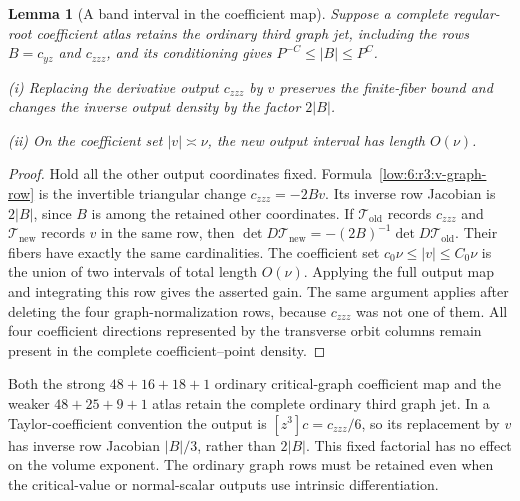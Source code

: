 \documentclass[11pt]{amsart}
\newtheorem{lemma}[theorem]{Lemma}
\theoremstyle{definition}
\theoremstyle{remark}
\numberwithin{equation}{section}
\begin{document}
\begin{lemma}[A band interval in the coefficient map]\label{low:6:r3:v-output}
Suppose a complete regular-root coefficient atlas retains the ordinary third graph jet, including the rows $B=c_{yz}$ and $c_{zzz}$, and its conditioning gives $P^{-C}\le |B|\le P^C$.

\noindent\textup{(i)} Replacing the derivative output $c_{zzz}$ by $v$ preserves the finite-fiber bound and changes the inverse output density by the factor $2|B|$.

\noindent\textup{(ii)} On the coefficient set $|v|\asymp\nu$, the new output interval has length $O(\nu)$. 
\end{lemma}
\begin{proof}
Hold all the other output coordinates fixed. Formula~\eqref{low:6:r3:v-graph-row} is the invertible triangular change $c_{zzz}=-2Bv$. Its inverse row Jacobian is $2|B|$, since $B$ is among the retained other coordinates. If $\mathcal T_{\mathrm{old}}$ records $c_{zzz}$ and $\mathcal T_{\mathrm{new}}$ records $v$ in the same row, then $\det D\mathcal T_{\mathrm{new}}=-(2B)^{-1}\det D\mathcal T_{\mathrm{old}}$. Their fibers have exactly the same cardinalities. The coefficient set $c_0\nu\le |v|\le C_0\nu$ is the union of two intervals of total length $O(\nu)$. Applying the full output map and integrating this row gives the asserted gain. The same argument applies after deleting the four graph-normalization rows, because $c_{zzz}$ was not one of them. All four coefficient directions represented by the transverse orbit columns remain present in the complete coefficient--point density.
\end{proof}

Both the strong $48+16+18+1$ ordinary critical-graph coefficient map and the weaker $48+25+9+1$ atlas retain the complete ordinary third graph jet. In a Taylor-coefficient convention the output is $[z^3]c=c_{zzz}/6$, so its replacement by $v$ has inverse row Jacobian $|B|/3$, rather than $2|B|$. This fixed factorial has no effect on the volume exponent. The ordinary graph rows must be retained even when the critical-value or normal-scalar outputs use intrinsic differentiation.
\end{document}
